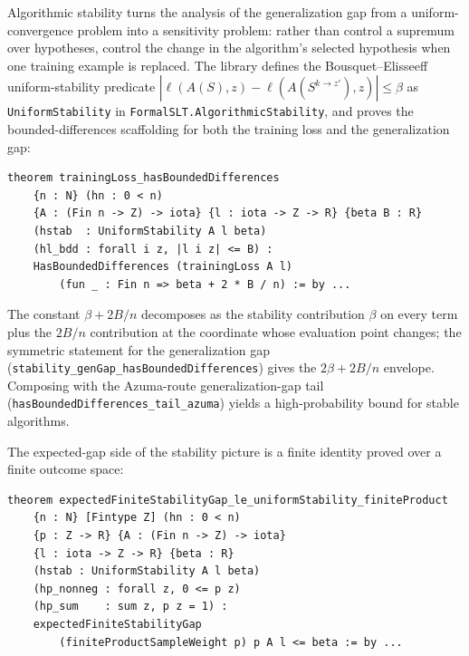 \documentclass[sigplan,anonymous,review,screen]{acmart}
\begin{document}
Algorithmic stability turns the analysis of the generalization gap from
a uniform-convergence problem into a sensitivity problem: rather than
control a supremum over hypotheses, control the change in the
algorithm's selected hypothesis when one training example is replaced.
The library defines the Bousquet--Elisseeff uniform-stability predicate
$|\ell(A(S), z) - \ell(A(S^{k\to z'}), z)| \le \beta$ as
\texttt{UniformStability} in \texttt{FormalSLT.AlgorithmicStability},
and proves the bounded-differences scaffolding for both the training
loss and the generalization gap:

\begin{lstlisting}[caption={Stability scaffolding for the training loss
                  (\texttt{FormalSLT/AlgorithmicStability.lean:464}).},
                  label={lst:stab-bounded-diff}]
theorem trainingLoss_hasBoundedDifferences
    {n : N} (hn : 0 < n)
    {A : (Fin n -> Z) -> iota} {l : iota -> Z -> R} {beta B : R}
    (hstab  : UniformStability A l beta)
    (hl_bdd : forall i z, |l i z| <= B) :
    HasBoundedDifferences (trainingLoss A l)
        (fun _ : Fin n => beta + 2 * B / n) := by ...
\end{lstlisting}

The constant $\beta + 2B/n$ decomposes as the stability contribution
$\beta$ on every term plus the $2B/n$ contribution at the
coordinate whose evaluation point changes; the symmetric statement for
the generalization gap (\texttt{stability\_genGap\_hasBoundedDifferences})
gives the $2\beta + 2B/n$ envelope. Composing with the Azuma-route
generalization-gap tail
(\texttt{hasBoundedDifferences\_tail\_azuma}) yields a high-probability
bound for stable algorithms.

The expected-gap side of the stability picture is a finite identity
proved over a finite outcome space:

\begin{lstlisting}[caption={Finite iid expected uniform-stability bound
                  (\texttt{FormalSLT/AlgorithmicStability.lean:1468}).},
                  label={lst:stab-expected},
                  basicstyle=\ttfamily\scriptsize]
theorem expectedFiniteStabilityGap_le_uniformStability_finiteProduct
    {n : N} [Fintype Z] (hn : 0 < n)
    {p : Z -> R} {A : (Fin n -> Z) -> iota}
    {l : iota -> Z -> R} {beta : R}
    (hstab : UniformStability A l beta)
    (hp_nonneg : forall z, 0 <= p z)
    (hp_sum    : sum z, p z = 1) :
    expectedFiniteStabilityGap
        (finiteProductSampleWeight p) p A l <= beta := by ...
\end{lstlisting}
\end{document}
